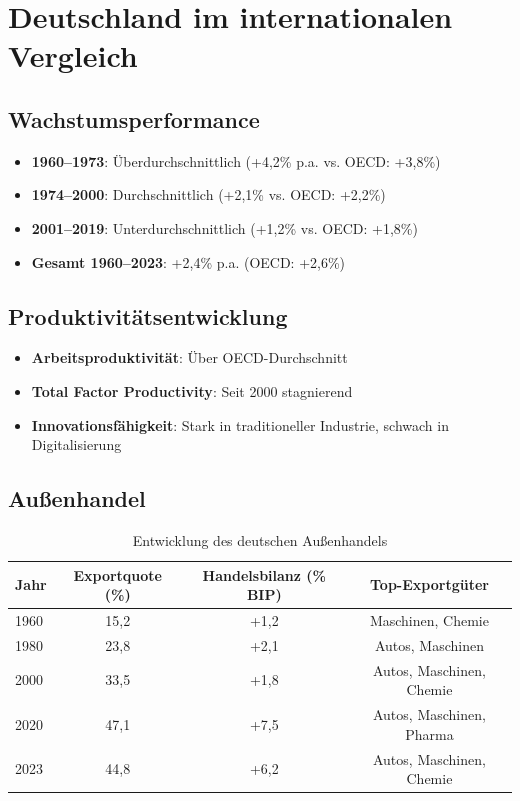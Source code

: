 \section{Deutschland im internationalen Vergleich}

\subsection{Wachstumsperformance}
\begin{itemize}
\item \textbf{1960--1973}: Überdurchschnittlich (+4,2\% p.a. vs. OECD: +3,8\%)
\item \textbf{1974--2000}: Durchschnittlich (+2,1\% vs. OECD: +2,2\%)
\item \textbf{2001--2019}: Unterdurchschnittlich (+1,2\% vs. OECD: +1,8\%)
\item \textbf{Gesamt 1960--2023}: +2,4\% p.a. (OECD: +2,6\%)
\end{itemize}

\subsection{Produktivitätsentwicklung}
\begin{itemize}
\item \textbf{Arbeitsproduktivität}: Über OECD-Durchschnitt
\item \textbf{Total Factor Productivity}: Seit 2000 stagnierend
\item \textbf{Innovationsfähigkeit}: Stark in traditioneller Industrie, schwach in Digitalisierung
\end{itemize}

\subsection{Außenhandel}
\begin{table}[h]
\centering
\begin{tabular}{lccc}
\toprule
\textbf{Jahr} & \textbf{Exportquote (\%)} & \textbf{Handelsbilanz (\% BIP)} & \textbf{Top-Exportgüter} \\
\midrule
1960 & 15,2 & +1,2 & Maschinen, Chemie \\
1980 & 23,8 & +2,1 & Autos, Maschinen \\
2000 & 33,5 & +1,8 & Autos, Maschinen, Chemie \\
2020 & 47,1 & +7,5 & Autos, Maschinen, Pharma \\
2023 & 44,8 & +6,2 & Autos, Maschinen, Chemie \\
\bottomrule
\end{tabular}
\caption{Entwicklung des deutschen Außenhandels}
\label{tab:aussenhandel}
\end{table}

